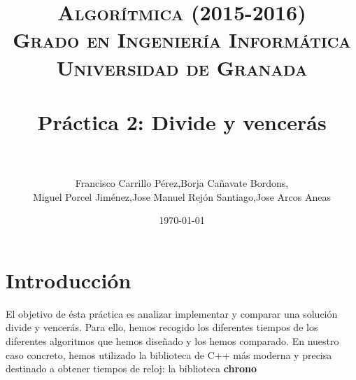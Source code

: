 
 \usepackage{algpseudocode}

\title{	
\normalfont \normalsize 
\textsc{{\bf Algorítmica (2015-2016)} \\ Grado en Ingeniería Informática \\ Universidad de Granada} \\ [25pt] %
\horrule{0.5pt} \\[0.4cm] %
\huge Práctica 2: Divide y vencerás \\ %
\horrule{2pt} \\[0.5cm] %
}

\author{Francisco Carrillo Pérez,Borja Cañavate Bordons, \\Miguel Porcel Jiménez,Jose Manuel Rejón Santiago,Jose Arcos Aneas} %

\date{\normalsize\today} %




\maketitle %

\newpage %

\tableofcontents %

\listoffigures

\listoftables

\newpage

\section{Introducción }

El objetivo de ésta práctica es analizar implementar y comparar una solución divide y vencerás.
Para ello, hemos recogido los diferentes tiempos de los diferentes algoritmos que hemos diseñado y los hemos comparado.
En nuestro caso concreto, hemos utilizado la biblioteca de C++ más moderna y precisa destinado a obtener tiempos de reloj: la biblioteca \textbf{chrono}

